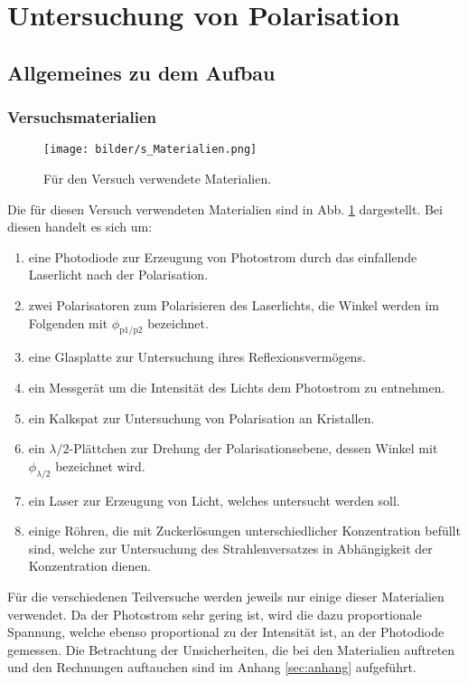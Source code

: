 \section{Untersuchung von Polarisation}

	\subsection{Allgemeines zu dem Aufbau}
	
		\subsubsection{Versuchsmaterialien}
		
			\begin{figure}[ht]
				\centering
				\texttt{[image: bilder/s\_Materialien.png]}
				\caption{Für den Versuch verwendete Materialien.\cite{WWU}}
				\label{fig:Materialien}	
			\end{figure}
			Die für diesen Versuch verwendeten Materialien sind in Abb. \ref{fig:Materialien} dargestellt.
			Bei diesen handelt es sich um:
			\begin{enumerate}
				\item eine Photodiode zur Erzeugung von Photostrom durch das einfallende Laserlicht nach der Polarisation.
				\item zwei Polarisatoren zum Polarisieren des Laserlichts, die Winkel werden im Folgenden mit $\phi_\text{p1/p2}$ bezeichnet.
				\item eine Glasplatte zur Untersuchung ihres Reflexionsvermögens.
				\item ein Messgerät um die Intensität des Lichts dem Photostrom zu entnehmen.
				\item ein Kalkspat zur Untersuchung von Polarisation an Kristallen.
				\item ein $\lambda/2$-Plättchen zur Drehung der Polarisationsebene, dessen Winkel mit $\phi_{\lambda/2}$ bezeichnet wird.
				\item ein Laser zur Erzeugung von Licht, welches untersucht werden soll.
				\item einige Röhren, die mit Zuckerlösungen unterschiedlicher Konzentration befüllt sind, welche zur Untersuchung des Strahlenversatzes in Abhängigkeit der Konzentration dienen.
			\end{enumerate} 
			Für die verschiedenen Teilversuche werden jeweils nur einige dieser Materialien verwendet.		
			Da der Photostrom sehr gering ist, wird die dazu proportionale Spannung, welche ebenso proportional zu der Intensität ist, an der Photodiode gemessen.
			Die Betrachtung der Unsicherheiten, die bei den Materialien auftreten und den Rechnungen auftauchen sind im Anhang \ref{sec:anhang} aufgeführt.
			
